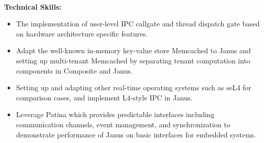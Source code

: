 \vspace{-1.0em}
\
\\
\textbf{\small Technical Skills:}
\begin{itemize}[leftmargin=*]
   \setlength\itemsep{-0.0em}
   	\item The implementation of user-level IPC callgate and thread dispatch gate based on hardware architecture specific features.
	\item Adapt the well-known in-memory key-value store Memcached to Janus and setting up multi-tenant Memcached by separating tenant computation into components in Composite and Janus.
	\item Setting up and adapting other real-time operating systems such as seL4 for comparison cases, and implement L4-style IPC in Janus.
	\item Leverage Patina which provides predictable interfaces including communication channels, event management, and synchronization to demonstrate performance of Janus on basic interfaces for embedded systems.
\end{itemize}
\
\\


